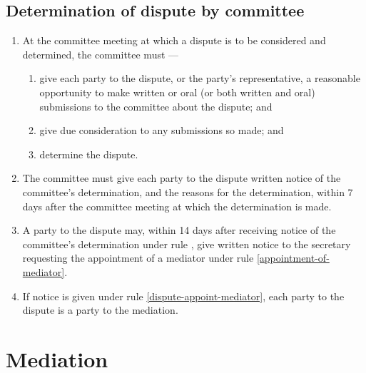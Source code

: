 \documentclass[../constitution.tex]{subfiles}
\begin{document}
\hypertarget{determination-of-dispute-by-committee}{%
\subsection{Determination of dispute by committee}\label{determination-of-dispute-by-committee}}

\begin{enumerate}

\item At the committee meeting at which a dispute is to be considered and determined, the committee must ---

  \begin{enumerate}
  
  \item give each party to the dispute, or the party's representative, a reasonable opportunity to make written or oral (or both written and oral) submissions to the committee about the dispute; and
  \item give due consideration to any submissions so made; and
  \item determine the dispute. \label{committee-determine-dispute}
  \end{enumerate}
\item The committee must give each party to the dispute written notice of the committee's determination, and the reasons for the determination, within 7 days after the committee meeting at which the determination is made.
\item A party to the dispute may, within 14 days after receiving notice of the committee's determination under rule , give written notice to the secretary requesting the appointment of a mediator under rule \ref{appointment-of-mediator}. \label{dispute-appoint-mediator}
\item If notice is given under rule \ref{dispute-appoint-mediator}, each party to the dispute is a party to the mediation.
\end{enumerate}

\hypertarget{division-4-mediation}{%
\section{Mediation}\label{division-4-mediation}}

\hypertarget{application-of-division-mediation}{%
\subsection{}\label{application-of-division-mediation}}
\end{document}
